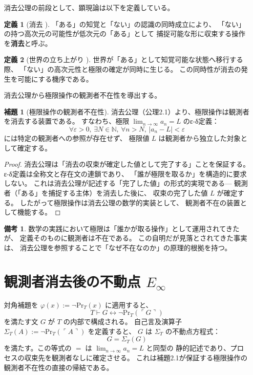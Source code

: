\documentclass[11pt,a4paper]{article}
\theoremstyle{definition}
\newtheorem{definition}{定義}[section]
\newtheorem{lemma}{補題}[section]
\newtheorem{remark}{備考}[section]
\newcommand{\Einfty}{E_\infty}
\newcommand{\SelfRef}{\Sigma}
\renewcommand{\Pr}{\mathrm{Pr}}
\begin{document}
消去公理の前段として、顕現論は以下を定義している。

\begin{definition}[消去 \cite{Chiba2026_chikaku} ]
「ある」の知覚と「ない」の認識の同時成立により、
「ない」の持つ高次元の可能性が低次元の「ある」として
捕捉可能な形に収束する操作を\textbf{消去}と呼ぶ。
\end{definition}

\begin{definition}[世界の立ち上がり \cite{Chiba2026_chikaku} ]
世界が「ある」として知覚可能な状態へ移行する際、
「ない」の高次元性と極限の確定が同時に生じる。
この同時性が消去の発生を可能にする機序である。
\end{definition}

消去公理から極限操作の観測者不在性を導出する。

\begin{lemma}[極限操作の観測者不在性]
消去公理（公理2.1）より、極限操作は観測者を消去する装置である。
すなわち、極限 $\lim_{n \to \infty} a_n = L$ のε-δ定義：
$$\forall \varepsilon > 0,\ \exists N \in \mathbb{N},\ \forall n > N,\
|a_n - L| < \varepsilon$$
には特定の観測者への参照が存在せず、
極限値 $L$ は観測者から独立した対象として確定する。
\end{lemma}

\begin{proof}
消去公理は「消去の収束が確定した値として完了する」ことを保証する。
ε-δ定義は全称文と存在文の連鎖であり、
「誰が極限を取るか」を構造的に要求しない。
これは消去公理が記述する「完了した値」の形式的実現である---
観測者（「ある」を捕捉する主体）を消去した後に、
収束の完了した値 $L$ が確定する。
したがって極限操作は消去公理の数学的実装として、
観測者不在の装置として機能する。
\end{proof}

\begin{remark}
数学の実践において極限は「誰かが取る操作」として運用されてきたが、
定義そのものに観測者は不在である。
この自明だが見落とされてきた事実は、
消去公理を参照することで「なぜ不在なのか」の原理的根拠を持つ。
\end{remark}

\section{観測者消去後の不動点 $\Einfty$}

対角補題を $\varphi(x) := \neg \Pr_T(x)$ に適用すると、
$$T \vdash G \leftrightarrow \neg \Pr_T(\ulcorner G \urcorner)$$
を満たす文 $G$ が $T$ の内部で構成される。
自己言及演算子 $\SelfRef_T(A) := \neg \Pr_T(\ulcorner A \urcorner)$ を定義すると、
$G$ は $\SelfRef_T$ の不動点方程式：
$$G = \SelfRef_T(G)$$
を満たす。この等式の $=$ は $\lim_{n\to\infty} a_n = L$ と同型の
静的記述であり、プロセスの収束先を観測者なしに確定させる。
これは補題2.1が保証する極限操作の観測者不在性の直接の帰結である。
\end{document}
